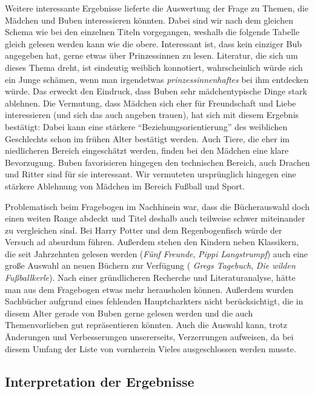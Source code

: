 

Weitere interessante Ergebnisse lieferte die Auswertung der Frage zu
Themen, die Mädchen und Buben interessieren könnten. Dabei sind wir nach
dem gleichen Schema wie bei den einzelnen Titeln vorgegangen, weshalb
die folgende Tabelle gleich gelesen werden kann wie die obere.
Interessant ist, dass kein einziger Bub angegeben hat, gerne etwas über
Prinzessinnen zu lesen. Literatur, die sich um dieses Thema dreht, ist
eindeutig weiblich konnotiert, wahrscheinlich würde sich ein Junge
schämen, wenn man irgendetwas \emph{prinzessinnenhaftes} bei ihm
entdecken würde. Das erweckt den Eindruck, dass Buben sehr
mädchentypische Dinge stark ablehnen. Die Vermutung, dass Mädchen sich
eher für Freundschaft und Liebe interessieren (und sich das auch angeben
trauen), hat sich mit diesem Ergebnis bestätigt: Dabei kann eine
stärkere ``Beziehungsorientierung'' des weiblichen Geschlechts schon im
frühen Alter bestätigt werden. Auch Tiere, die eher im niedlicheren
Bereich eingeschätzt werden, finden bei den Mädchen eine klare
Bevorzugung. Buben favorisieren hingegen den technischen Bereich, auch
Drachen und Ritter sind für sie interessant. Wir vermuteten ursprünglich
hingegen eine stärkere Ablehnung von Mädchen im Bereich Fußball und
Sport.



Problematisch beim Fragebogen im Nachhinein war, dass die Bücherauswahl
doch einen weiten Range abdeckt und Titel deshalb auch teilweise schwer
miteinander zu vergleichen sind. Bei Harry Potter und dem
Regenbogenfisch würde der Versuch ad absurdum führen. Außerdem stehen
den Kindern neben Klassikern, die seit Jahrzehnten gelesen werden
(\emph{Fünf Freunde}, \emph{Pippi Langstrumpf}) auch eine große Auswahl
an neuen Büchern zur Verfügung ( \emph{Gregs Tagebuch}, \emph{Die wilden
Fußballkerle}). Nach einer gründlicheren Recherche und Literaturanalyse,
hätte man aus dem Fragebogen etwas mehr herausholen können. Außerdem
wurden Sachbücher aufgrund eines fehlenden Hauptcharkters nicht
berücksichtigt, die in diesem Alter gerade von Buben gerne gelesen
werden und die auch Themenvorlieben gut repräsentieren könnten. Auch die
Auswahl kann, trotz Änderungen und Verbesserungen unsererseits,
Verzerrungen aufweisen, da bei diesem Umfang der Liste von vornherein
Vieles ausgeschlossen werden musste.

\subsection{Interpretation der Ergebnisse}

